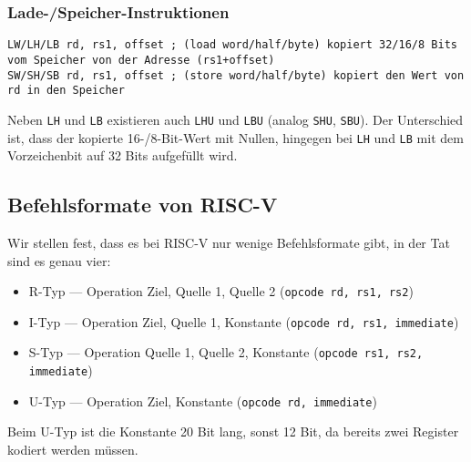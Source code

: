 \subsubsection{Lade-/Speicher-Instruktionen}

\begin{lstlisting}[style=risc-v_Assembler]
LW/LH/LB rd, rs1, offset ; (load word/half/byte) kopiert 32/16/8 Bits vom Speicher von der Adresse (rs1+offset)
SW/SH/SB rd, rs1, offset ; (store word/half/byte) kopiert den Wert von rd in den Speicher
\end{lstlisting}

Neben \lstinline[style=risc-v_Assembler]!LH! und \lstinline[style=risc-v_Assembler]!LB! existieren auch \lstinline[style=risc-v_Assembler]!LHU! und \lstinline[style=risc-v_Assembler]!LBU! (analog \lstinline[style=risc-v_Assembler]!SHU!, \lstinline[style=risc-v_Assembler]!SBU!). Der Unterschied ist, dass der
kopierte 16-/8-Bit-Wert mit Nullen, hingegen bei \lstinline[style=risc-v_Assembler]!LH! und \lstinline[style=risc-v_Assembler]!LB! mit dem Vorzeichenbit auf 32 Bits aufgefüllt wird.

\subsection{Befehlsformate von RISC-V}

Wir stellen fest, dass es bei RISC-V nur wenige Befehlsformate gibt, in der Tat sind es genau vier:

\begin{itemize}
\item R-Typ --- Operation Ziel, Quelle 1, Quelle 2 (\lstinline[style=risc-v_Assembler]!opcode rd, rs1, rs2!)
\item I-Typ --- Operation Ziel, Quelle 1, Konstante (\lstinline[style=risc-v_Assembler]!opcode rd, rs1, immediate!)
\item S-Typ --- Operation Quelle 1, Quelle 2, Konstante (\lstinline[style=risc-v_Assembler]!opcode rs1, rs2, immediate!)
\item U-Typ --- Operation Ziel, Konstante (\lstinline[style=risc-v_Assembler]!opcode rd, immediate!)
\end{itemize}

Beim U-Typ ist die Konstante 20 Bit lang, sonst 12 Bit, da bereits zwei Register kodiert werden müssen.
